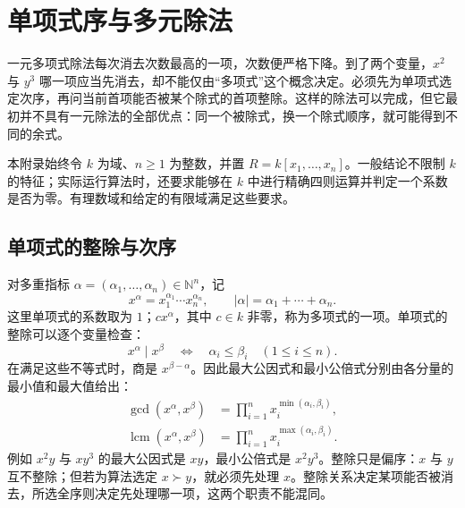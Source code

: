 

\section{单项式序与多元除法}
\label{b1:sec:F01}

一元多项式除法每次消去次数最高的一项，次数便严格下降。到了两个变量，\(x^2\) 与 \(y^3\) 哪一项应当先消去，却不能仅由“多项式”这个概念决定。必须先为单项式选定次序，再问当前首项能否被某个除式的首项整除。这样的除法可以完成，但它最初并不具有一元除法的全部优点：同一个被除式，换一个除式顺序，就可能得到不同的余式。

\ProseParagraphBreak
本附录始终令 \(k\) 为域、\(n\geq1\) 为整数，并置 \(R=k[x_1,\ldots,x_n]\)。一般结论不限制 \(k\) 的特征；实际运行算法时，还要求能够在 \(k\) 中进行精确四则运算并判定一个系数是否为零。有理数域和给定的有限域满足这些要求。

\subsection{单项式的整除与次序}
\label{b1:subsec:F01:01}

对多重指标 \(\alpha=(\alpha_1,\ldots,\alpha_n)\in\mathbb N^n\)，记
\[
	x^\alpha=x_1^{\alpha_1}\cdots x_n^{\alpha_n},\qquad |\alpha|=\alpha_1+\cdots+\alpha_n.
\]
这里单项式的系数取为 \(1\)；\(c x^\alpha\)，其中 \(c\in k\) 非零，称为多项式的一项。单项式的整除可以逐个变量检查：
\[
	x^\alpha\mid x^\beta \quad\Longleftrightarrow\quad \alpha_i\leq\beta_i\quad(1\leq i\leq n).
\]
在满足这些不等式时，商是 \(x^{\beta-\alpha}\)。因此最大公因式和最小公倍式分别由各分量的最小值和最大值给出：
\[
	\begin{aligned}
		\gcd(x^\alpha,x^\beta) &=\prod_{i=1}^n x_i^{\min(\alpha_i,\beta_i)},\\
		\operatorname{lcm}(x^\alpha,x^\beta) &=\prod_{i=1}^n x_i^{\max(\alpha_i,\beta_i)}.
	\end{aligned}
\]
例如 \(x^2y\) 与 \(xy^3\) 的最大公因式是 \(xy\)，最小公倍式是 \(x^2y^3\)。整除只是偏序：\(x\) 与 \(y\) 互不整除；但若为算法选定 \(x\succ y\)，就必须先处理 \(x\)。整除关系决定某项能否被消去，所选全序则决定先处理哪一项，这两个职责不能混同。

